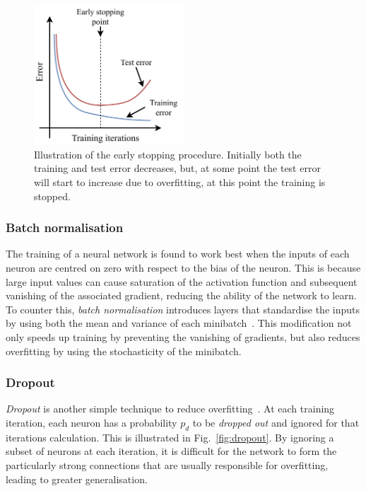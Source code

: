 \begin{figure} %
    \includegraphics[width=0.5\textwidth]{diagrams/6-cnn/early_stopping.pdf}
    \caption[Illustration of the early stopping procedure]
    {Illustration of the early stopping procedure. Initially both the training and test error
        decreases, but, at some point the test error will start to increase due to overfitting, at
        this point the training is stopped.}
    \label{fig:early_stopping}
\end{figure}

\subsubsection*{Batch normalisation} %

The training of a neural network is found to work best when the inputs of each neuron are centred
on zero with respect to the bias of the neuron. This is because large input values can cause
saturation of the activation function and subsequent vanishing of the associated gradient,
reducing the ability of the network to learn. To counter this, \emph{batch normalisation}
introduces layers that standardise the inputs by using both the mean and variance of each
minibatch~\cite{ioffe2015}. This modification not only speeds up training by preventing the
vanishing of gradients, but also reduces overfitting by using the stochasticity of the minibatch.

\subsubsection*{Dropout} %

\emph{Dropout} is another simple technique to reduce overfitting~\cite{hinton2012}. At each
training iteration, each neuron has a probability $p_{d}$ to be \emph{dropped out} and ignored for
that iterations calculation. This is illustrated in Fig.~\ref{fig:dropout}. By ignoring a subset
of neurons at each iteration, it is difficult for the network to form the particularly strong
connections that are usually responsible for overfitting, leading to greater generalisation.

